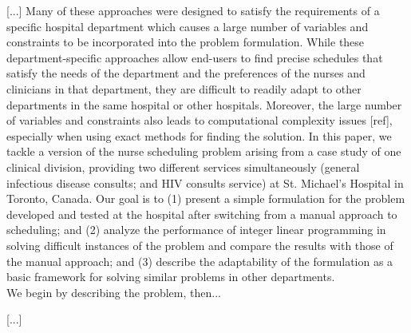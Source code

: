 
[...] Many of these approaches were designed to satisfy the requirements of a specific hospital department which causes a large number of variables and constraints to be incorporated into the problem formulation. While these department-specific approaches allow end-users to find precise schedules that satisfy the needs of the department and the preferences of the nurses and clinicians in that department, they are difficult to readily adapt to other departments in the same hospital or other hospitals. %
Moreover, the large number of variables and constraints also leads to computational complexity issues [ref], especially when using exact methods for finding the solution. In this paper, we tackle a version of the nurse scheduling problem arising from a case study of one clinical division, providing two different services simultaneously (general infectious disease consults; and HIV consults service) at St. Michael's Hospital in Toronto, Canada. Our goal is to (1) present a simple formulation for the problem developed and tested at the hospital after switching from a manual approach to scheduling; and (2) analyze the performance of integer linear programming in solving difficult instances of the problem and compare the results with those of the manual approach; and (3) describe the adaptability of the formulation as a basic framework for solving similar problems in other departments. \\ %
We begin by describing the problem, then...%

[...]

